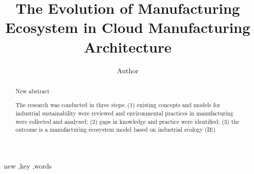 
\title{The Evolution of Manufacturing Ecosystem in Cloud Manufacturing Architecture
}

\author[label1]{Author}
\address[label1]{ZJU}
\begin{abstract}
New abstract




The research was conducted in three steps: (1) existing concepts and models for industrial sustainability were reviewed and environmental practices in manufacturing were collected and analysed; (2) gaps in knowledge and practice were identified; (3) the outcome is a manufacturing ecosystem model based on industrial ecology (IE)


\end{abstract}

\begin{keyword}
new \sep key \sep words
\end{keyword}